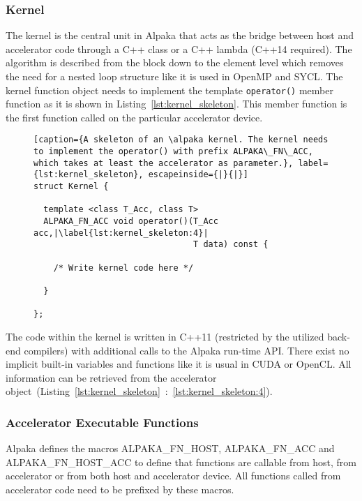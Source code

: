\documentclass[10pt, twocolumn]{article}
\newcommand{\alpaka}{Alpaka\xspace}
\newcommand{\cuda}{{CUDA}\xspace}
\newcommand{\openmp}{{OpenMP}\xspace}
\newcommand{\opencl}{{OpenCL}\xspace}
\newcommand{\cpp}[1]{\lstinline[identifierstyle=\color{black}\bfseries]{#1}}
\begin{document}
\hfill
\subsubsection{Kernel}
The kernel is the central unit in \alpaka that acts as the bridge between host and accelerator code through a C++ class or a C++ lambda (C++14 required).
The algorithm is described from the block down to the element level which removes the need for a nested loop structure like it is used in \openmp and  SYCL.
The kernel function object needs to implement the template \cpp{operator()} member function as it is shown in Listing~\ref{lst:kernel_skeleton}.
This member function is the first function called on the particular accelerator device.

\begin{figure}
\begin{minipage}{\linewidth}
\hfill
  \begin{lstlisting}[caption={A skeleton of an \alpaka kernel. The kernel needs to implement the operator() with prefix ALPAKA\_FN\_ACC, which takes at least the accelerator as parameter.}, label={lst:kernel_skeleton}, escapeinside={|}{|}]
struct Kernel {

  template <class T_Acc, class T>
  ALPAKA_FN_ACC void operator()(T_Acc acc,|\label{lst:kernel_skeleton:4}|
                                T data) const {

    /* Write kernel code here */

  }

};
  \end{lstlisting}
\end{minipage}
      \vspace{-2.5em}
\end{figure}

\noindent The code within the kernel is written in C++11 (restricted by the utilized back-end compilers) with additional calls to the \alpaka run-time API.
There exist no implicit built-in variables and functions like it is usual in \cuda or \opencl.
All information can be retrieved from the accelerator object~(Listing~\ref{lst:kernel_skeleton}~:~\ref{lst:kernel_skeleton:4}).
\subsubsection{Accelerator Executable Functions}
\alpaka defines the macros ALPAKA\_FN\_HOST, ALPAKA\_FN\_ACC and ALPAKA\_FN\_HOST\_ACC to define that functions are callable from host, from accelerator or from both host and accelerator device.
All functions called from accelerator code need to be prefixed by these macros.
\end{document}
